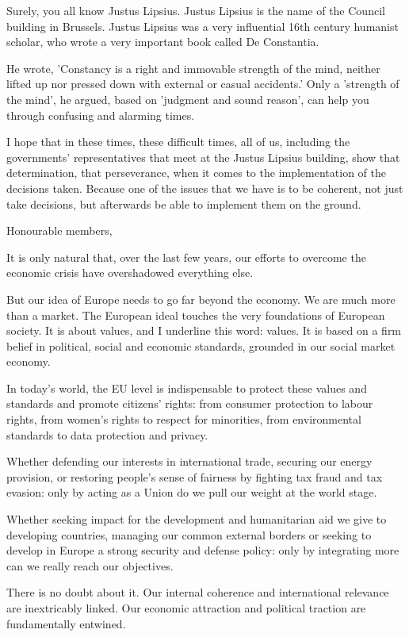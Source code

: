 \documentclass[a4paper,11pt]{article}
\begin{document}
Surely, you all know Justus Lipsius. Justus Lipsius is the name of the Council building in Brussels. Justus Lipsius was a very influential 16th century humanist scholar, who wrote a very important book called De Constantia.

He wrote, 'Constancy is a right and immovable strength of the mind, neither lifted up nor pressed down with external or casual accidents.' Only a 'strength of the mind', he argued, based on 'judgment and sound reason', can help you through confusing and alarming times.

I hope that in these times, these difficult times, all of us, including the governments' representatives that meet at the Justus Lipsius building, show that determination, that perseverance, when it comes to the implementation of the decisions taken. Because one of the issues that we have is to be coherent, not just take decisions, but afterwards be able to implement them on the ground.

Honourable members,

It is only natural that, over the last few years, our efforts to overcome the economic crisis have overshadowed everything else.

But our idea of Europe needs to go far beyond the economy. We are much more than a market. The European ideal touches the very foundations of European society. It is about values, and I underline this word: values. It is based on a firm belief in political, social and economic standards, grounded in our social market economy.

In today's world, the EU level is indispensable to protect these values and standards and promote citizens' rights: from consumer protection to labour rights, from women's rights to respect for minorities, from environmental standards to data protection and privacy.

Whether defending our interests in international trade, securing our energy provision, or restoring people's sense of fairness by fighting tax fraud and tax evasion: only by acting as a Union do we pull our weight at the world stage.

Whether seeking impact for the development and humanitarian aid we give to developing countries, managing our common external borders or seeking to develop in Europe a strong security and defense policy: only by integrating more can we really reach our objectives.

There is no doubt about it. Our internal coherence and international relevance are inextricably linked. Our economic attraction and political traction are fundamentally entwined.
\end{document}
